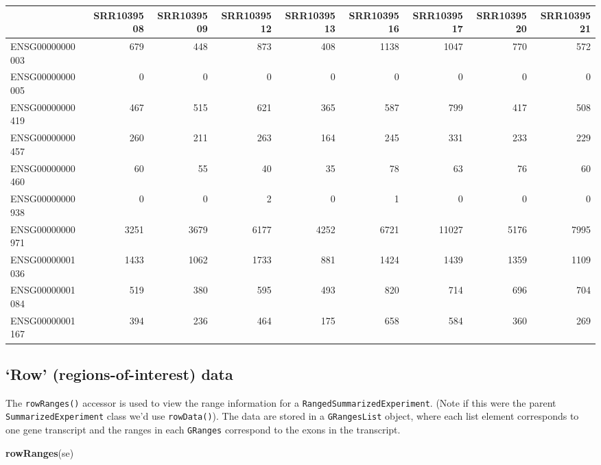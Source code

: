 \documentclass[]{article}
\newenvironment{Shaded}{\begin{snugshade}}{\end{snugshade}}
\newcommand{\KeywordTok}[1]{\textcolor[rgb]{0.13,0.29,0.53}{\textbf{#1}}}
\newcommand{\NormalTok}[1]{#1}
\begin{document}
\begin{longtable}[]{@{}lrrrrrrrr@{}}
\toprule
& SRR1039508 & SRR1039509 & SRR1039512 & SRR1039513 & SRR1039516 &
SRR1039517 & SRR1039520 & SRR1039521\tabularnewline
\midrule
\endhead
ENSG00000000003 & 679 & 448 & 873 & 408 & 1138 & 1047 & 770 &
572\tabularnewline
ENSG00000000005 & 0 & 0 & 0 & 0 & 0 & 0 & 0 & 0\tabularnewline
ENSG00000000419 & 467 & 515 & 621 & 365 & 587 & 799 & 417 &
508\tabularnewline
ENSG00000000457 & 260 & 211 & 263 & 164 & 245 & 331 & 233 &
229\tabularnewline
ENSG00000000460 & 60 & 55 & 40 & 35 & 78 & 63 & 76 & 60\tabularnewline
ENSG00000000938 & 0 & 0 & 2 & 0 & 1 & 0 & 0 & 0\tabularnewline
ENSG00000000971 & 3251 & 3679 & 6177 & 4252 & 6721 & 11027 & 5176 &
7995\tabularnewline
ENSG00000001036 & 1433 & 1062 & 1733 & 881 & 1424 & 1439 & 1359 &
1109\tabularnewline
ENSG00000001084 & 519 & 380 & 595 & 493 & 820 & 714 & 696 &
704\tabularnewline
ENSG00000001167 & 394 & 236 & 464 & 175 & 658 & 584 & 360 &
269\tabularnewline
\bottomrule
\end{longtable}

\hypertarget{row-regions-of-interest-data}{%
\subsection{`Row' (regions-of-interest)
data}\label{row-regions-of-interest-data}}

The \texttt{rowRanges()} accessor is used to view the range information
for a \texttt{RangedSummarizedExperiment}. (Note if this were the parent
\texttt{SummarizedExperiment} class we'd use \texttt{rowData()}). The
data are stored in a \texttt{GRangesList} object, where each list
element corresponds to one gene transcript and the ranges in each
\texttt{GRanges} correspond to the exons in the transcript.

\begin{Shaded}
\begin{Highlighting}[]
\KeywordTok{rowRanges}\NormalTok{(se)}
\end{Highlighting}
\end{Shaded}
\end{document}
